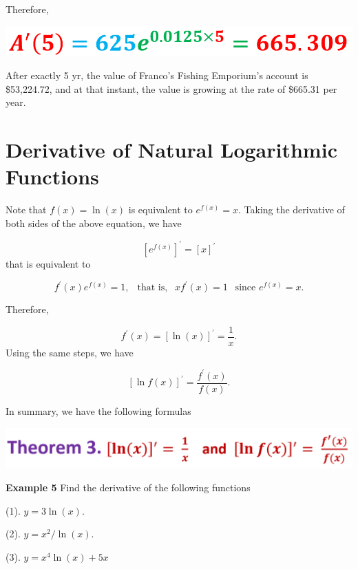 \documentclass[
]{book}
\begin{document}
\hfill\break
Therefore,\\

\begin{center}\includegraphics[width=0.7\linewidth]{img05/w05-BalanceFunDA(5)} \end{center}

After exactly 5 yr, the value of Franco's Fishing Emporium's account is \$53,224.72, and at that instant, the value is growing at the rate of \$665.31 per year.

\hfill\break

\hypertarget{derivative-of-natural-logarithmic-functions}{%
\section{Derivative of Natural Logarithmic Functions}\label{derivative-of-natural-logarithmic-functions}}

\hfill\break

Note that \(f(x) = \ln(x)\) is equivalent to \(e^{f(x)} = x\). Taking the derivative of both sides of the above equation, we have

\[
[e^{f(x)}]^\prime = [x]^\prime
\]
that is equivalent to

\[
f^\prime(x) e^{f(x)} = 1, \ \ \text{ that is, } \ \ x f^\prime(x) = 1 \ \ \text{ since } e^{f(x)} = x.
\]

Therefore,

\[
f^\prime(x) = [\ln(x)]^\prime = \frac{1}{x}.
\]
Using the same steps, we have

\[
[\ln f(x)]^\prime = \frac{f^\prime(x)}{f(x)}.
\]

In summary, we have the following formulas

\begin{center}\includegraphics[width=0.7\linewidth]{img05/w05-derivativeLog} \end{center}

\textbf{Example 5} Find the derivative of the following functions

(1). \(y = 3\ln (x)\).

(2). \(y = x^2/\ln (x)\).

(3). \(y = x^4\ln(x) + 5x\)
\end{document}
